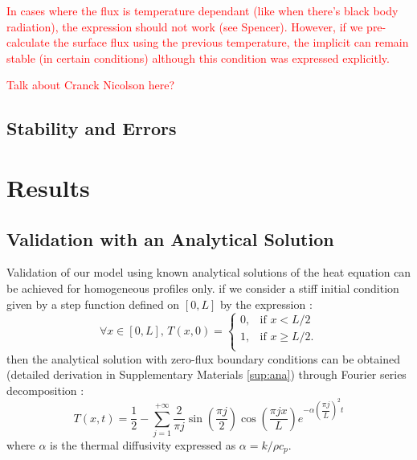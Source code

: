\documentclass[]{interact}
\theoremstyle{plain}%
\theoremstyle{definition}
\theoremstyle{remark}
\begin{document}
\textcolor{red}{In cases where the flux is temperature dependant (like when there's black body radiation), the expression should not work (see Spencer). However, if we pre-calculate the surface flux using the previous temperature, the implicit can remain stable (in certain conditions) although this condition was expressed explicitly.}

\textcolor{red}{Talk about Cranck Nicolson here?}

\subsection{Stability and Errors}

\section{Results}

\subsection{Validation with an Analytical Solution}

Validation of our model using known analytical solutions of the heat equation can be achieved for homogeneous profiles only.
if we consider a stiff initial condition given by a step function defined on $[0, L]$ by the expression :
\begin{equation}
    \forall x \in [0, L], \, T(x, 0) = \left\{
\begin{array}{ll}
0, & \text{if } x < L/2 \\
1, &  \text{if } x \geq L/2.\\
\end{array}
    \right.
\label{eq:step_fct}
\end{equation}
then the analytical solution with zero-flux boundary conditions can be obtained (detailed derivation in Supplementary Materials \ref{sup:ana}) through Fourier series decomposition :
\begin{equation}
    T(x, t) = \frac{1}{2} - \sum_{j=1}^{+\infty} \frac{2}{\pi j} \sin\left(\frac{\pi j}{2}\right) \cos\left(\frac{\pi j x}{L}\right)    e^{-\alpha \left(\dfrac{ \pi j}{L} \right)^2 t}
\end{equation}
where $\alpha$ is the thermal diffusivity expressed as $\alpha= k / \rho c_p$.
\end{document}
